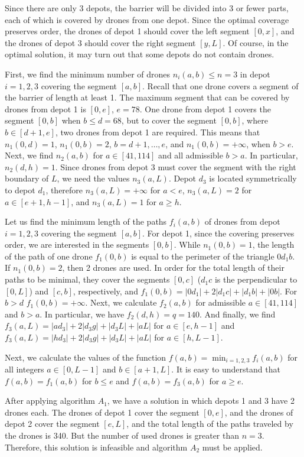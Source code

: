 \documentclass[runningheads]{llncs}
\begin{document}
Since there are only 3 depots, the barrier will be divided into 3 or fewer parts, each of which is covered by drones from one depot. Since the optimal coverage preserves order, the drones of depot 1 should cover the left segment $[0,x]$, and the drones of depot 3 should cover the right segment $[y,L]$. Of course, in the optimal solution, it may turn out that some depots do not contain drones.

First, we find the minimum number of drones $n_i(a,b)\leq n=3$ in depot $i=1,2,3$ covering the segment $[a,b]$. Recall that one drone covers a segment of the barrier of length at least 1. The maximum segment that can be covered by drones from depot 1 is $[0,e]$, $e=78$. One drone from depot 1 covers the segment $[0,b]$ when $b\leq d=68$, but to cover the segment $[0,b]$, where $b\in[d+1,e]$, two drones from depot 1 are required. This means that $n_1(0,d)=1$, $n_1(0,b)=2$, $b=d+1,\ldots,e$, and $n_1(0,b)=+\infty$, when $b>e$. Next, we find $n_2(a,b)$ for $a\in[41,114]$ and all admissible $b>a$. In particular, $n_2(d,h)=1$. Since drones from depot 3 must cover the segment with the right boundary of $L$, we need the values $n_3(a,L)$. Depot $d_3$ is located symmetrically to depot $d_1$, therefore $n_3(a,L)=+\infty$ for $a<e$, $n_3(a,L)=2$ for $a\in[e+1,h-1]$, and $n_3(a,L)=1$ for $a\geq h$.

Let us find the minimum length of the paths $f_i(a,b)$ of drones from depot $i=1,2,3$ covering the segment $[a,b]$. For depot 1, since the covering preserves order, we are interested in the segments $[0,b]$. While $n_1(0,b)=1$, the length of the path of one drone $f_1(0,b)$ is equal to the perimeter of the triangle $0d_1b$. If $n_1(0,b)=2$, then 2 drones are used. In order for the total length of their paths to be minimal, they cover the segments $[0,c]$ ($d_1c$ is the perpendicular to $[0,L]$) and $[c,b]$, respectively, and $f_1(0,b)=|0d_1|+2|d_1c|+|d_1b|+|0b|$. For $b>d$ $f_1(0,b)=+\infty$. Next, we calculate $f_2(a,b)$ for admissible $a\in[41,114]$ and $b>a$. In particular, we have $f_2(d,h)=q=140$. And finally, we find $f_3(a,L)=|ad_3|+2|d_3g|+|d_3L|+|aL|$ for $a\in[e,h-1]$ and $f_3(a,L)=|hd_3|+2|d_3g|+|d_3L|+|aL|$ for $a\in[h,L-1]$.

Next, we calculate the values of the function $f(a,b)=\min_{i=1,2,3}f_i(a,b)$ for all integers $a\in[0,L-1]$ and $b\in[a+1,L]$. It is easy to understand that $f(a,b)=f_1(a,b)$ for $b\leq e$ and $f(a,b)=f_3(a,b)$ for $a\geq e$.

After applying algorithm $A_1$, we have a solution in which depots 1 and 3 have 2 drones each. The drones of depot 1 cover the segment $[0,e]$, and the drones of depot 2 cover the segment $[e,L]$, and the total length of the paths traveled by the drones is 340. But the number of used drones is greater than $n=3$. Therefore, this solution is infeasible and algorithm $A_2$ must be applied.
\end{document}
